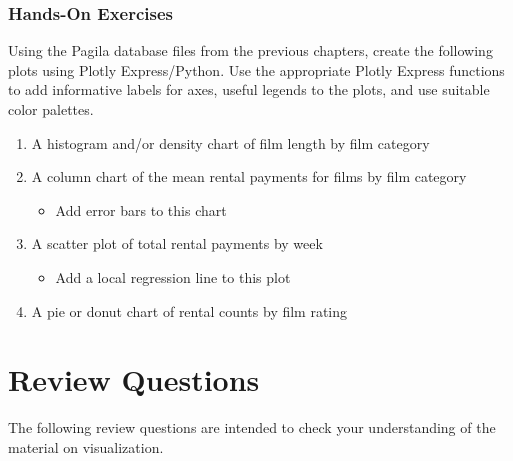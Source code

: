 \begin{tcolorbox}[colback=code]
\subsubsection*{Hands-On Exercises}

Using the Pagila database files from the previous chapters, create the following plots using Plotly Express/Python. Use the appropriate Plotly Express functions to add informative labels for axes, useful legends to the plots, and use suitable color palettes. 

\begin{enumerate}
   \item A histogram and/or density chart of film length by film category
   \item A column chart of the mean rental payments for films by film category
   \begin{itemize}
      \item Add error bars to this chart
   \end{itemize}
   \item A scatter plot of total rental payments by week
   \begin{itemize}
      \item Add a local regression line to this plot
   \end{itemize}
   \item A pie or donut chart of rental counts by film rating
\end{enumerate}
\end{tcolorbox}

\section{Review Questions}

The following review questions are intended to check your understanding of the material on visualization.

